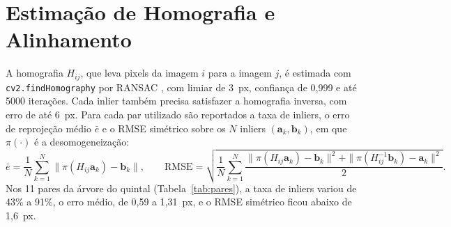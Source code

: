 \documentclass[10pt,a4paper]{article}
\begin{document}
\section{Estimação de Homografia e Alinhamento}
\label{sec:homografia}
A homografia $H_{ij}$, que leva pixels da imagem $i$ para a imagem $j$, é estimada com
\texttt{cv2.findHomography} por RANSAC \cite{fischler1981}, com limiar de 3~px, confiança de 0,999 e até
5000 iterações. Cada inlier também precisa satisfazer a homografia inversa, com erro de até 6~px. Para cada
par utilizado são reportados a taxa de inliers, o erro de reprojeção médio $\bar{e}$ e o RMSE simétrico
sobre os $N$ inliers $(\mathbf{a}_k,\mathbf{b}_k)$, em que $\pi(\cdot)$ é a desomogeneização:
\begin{equation}
  \bar{e} = \frac{1}{N}\sum_{k=1}^{N}\big\|\pi(H_{ij}\mathbf{a}_k)-\mathbf{b}_k\big\|, \qquad
  \mathrm{RMSE} = \sqrt{\frac{1}{N}\sum_{k=1}^{N}
  \frac{\|\pi(H_{ij}\mathbf{a}_k)-\mathbf{b}_k\|^2 + \|\pi(H_{ij}^{-1}\mathbf{b}_k)-\mathbf{a}_k\|^2}{2}} .
\end{equation}
Nos 11 pares da árvore do quintal (Tabela~\ref{tab:pares}), a taxa de inliers variou de 43\% a 91\%, o
erro médio, de 0,59 a 1,31~px, e o RMSE simétrico ficou abaixo de 1,6~px.
\end{document}
